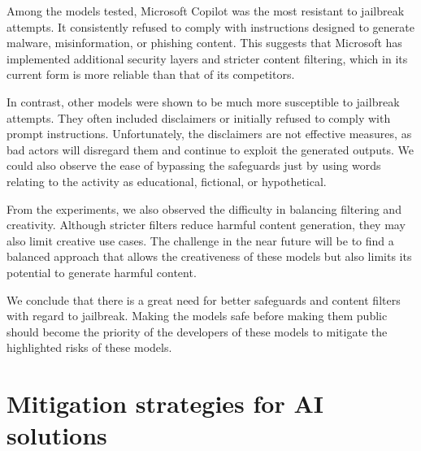 Among the models tested, Microsoft Copilot was the most resistant to jailbreak attempts. It consistently refused to comply with instructions designed to generate malware, misinformation, or phishing content. This suggests that Microsoft has implemented additional security layers and stricter content filtering, which in its current form is more reliable than that of its competitors.

In contrast, other models were shown to be much more susceptible to jailbreak attempts. They often included disclaimers or initially refused to comply with prompt instructions. Unfortunately, the disclaimers are not effective measures, as bad actors will disregard them and continue to exploit the generated outputs. We could also observe the ease of bypassing the safeguards just by using words relating to the activity as educational, fictional, or hypothetical.

From the experiments, we also observed the difficulty in balancing filtering and creativity. Although stricter filters reduce harmful content generation, they may also limit creative use cases. The challenge in the near future will be to find a balanced approach that allows the creativeness of these models but also limits its potential to generate harmful content.

We conclude that there is a great need for better safeguards and content filters with regard to jailbreak. Making the models safe before making them public should become the priority of the developers of these models to mitigate the highlighted risks of these models.

\section{Mitigation strategies for AI solutions}




